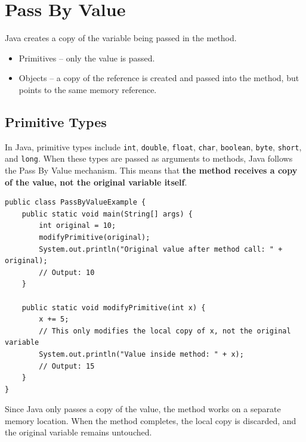 \documentclass[letterpaper,12pt]{article}
\begin{document}
\section{Pass By Value}
Java creates a copy of the variable being passed in the method.
\begin{itemize}
    \item Primitives – only the value is passed.
    \item Objects – a copy of the reference is created and passed into the method, but points to the same memory reference.
\end{itemize}
\subsection{Primitive Types}
In Java, primitive types include \texttt{int}, \texttt{double}, \texttt{float}, \texttt{char}, \texttt{boolean}, \texttt{byte}, \texttt{short}, and \texttt{long}. When these types are passed as arguments to methods, Java follows the Pass By Value mechanism. This means that \textbf{the method receives a copy of the value, not the original variable itself}.
\begin{verbatim}
public class PassByValueExample {
    public static void main(String[] args) {
        int original = 10;
        modifyPrimitive(original);
        System.out.println("Original value after method call: " + original);  
        // Output: 10
    }

    public static void modifyPrimitive(int x) {
        x += 5;
        // This only modifies the local copy of x, not the original variable
        System.out.println("Value inside method: " + x);
        // Output: 15
    }
}
\end{verbatim}
Since Java only passes a copy of the value, the method works on a separate memory location. When the method completes, the local copy is discarded, and the original variable remains untouched.
\end{document}
